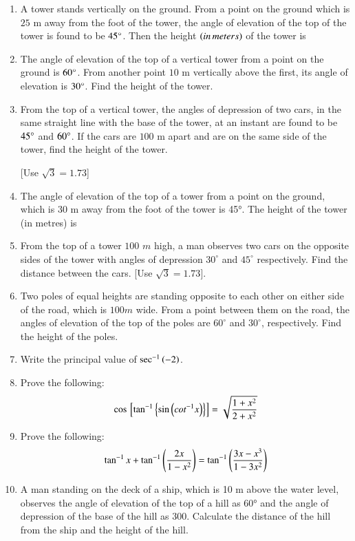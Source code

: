 \begin{enumerate}
\hfill{}
\item A tower stands vertically on the ground. From a point on the ground which is $25$ m away from the foot of the tower, the angle of elevation of the top of the tower is found to be $45\degree$. Then the height $\left(in\,meters\right)$ of the tower is



\hfill{}\item The angle of elevation of the top of a vertical tower from a point on the ground is $60\degree$. From another point $10$ m vertically above the first, its angle of elevation is $30\degree$. Find the height of the tower.


\hfill{}\item From the top of a vertical tower, the angles of depression of two cars, in the same straight line with the base of the tower, at an instant are found to be $45\degree$ and $60\degree$. If the cars are $100$ m apart and are on the same side of the tower, find the height of the tower. 

[Use $\sqrt{3} = 1.73$]
\hfill{}
    \item The angle of elevation of the top of a tower from a point on the ground, which is 30 m away from the foot of the tower is 45°. The height of the tower (in metres) is
    \hfill{}\item From the top of a tower $100$ $m$ high, a man observes two cars on the opposite sides of the tower with angles of depression $30^\circ$ and $45^\circ$ respectively. Find the distance between the cars. [Use $\sqrt{3}=1.73$].
    \hfill{}\item Two poles of equal heights are standing opposite to each other on either side of the road, which is $100m$ wide. From a point between them on the road, the angles of elevation of the top of the poles are $60^\circ$ and $30^\circ$, respectively. Find the height of the poles.
\hfill{}


\item Write the principal value of $\sec^{-1} \left(-2\right)$.

\hfill{}\item Prove the following:
    \begin{align*}
        \cos {}\left[\tan^{-1} \left\{\sin \left(cot^{-1} x\right)\right\}\right] = \sqrt{\frac{1 + x^2}{2 + x^2}}
    \end{align*}

\hfill{}\item Prove the following:
    \begin{align*}
        \tan^{-1} x + \tan^{-1} \left(\frac{2x}{1 - x^2}\right) = \tan^{-1} \left(\frac{3x - x^3}{1 - 3x^2}\right)
    \end{align*}
\hfill{}
\item A man standing on the deck of a ship, which is 10 m above the water level, observes the
angle of elevation of the top of a hill as 60° and the angle of depression of the base of the hill as
300. Calculate the distance of the hill from the ship and the height of the hill.


\end{enumerate}

